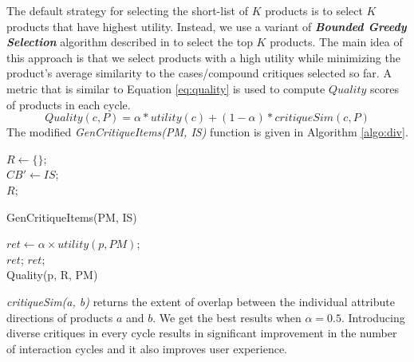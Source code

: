 The default strategy for selecting the short-list of $K$ products is to select $K$ products that have highest utility.
Instead, we use a variant of \textit{\textbf{Bounded Greedy Selection}} algorithm described in \cite{boundedGreedy} to select the top $K$ products.
The main idea of this approach is that we select products with a high utility while minimizing the product's average similarity to the cases/compound critiques selected so far.
A metric that is similar to Equation \ref{eq:quality} is used to compute $Quality$ scores of products in each cycle.
\begin{equation}
\label{eq:quality}
Quality(c, P) = \alpha * utility(c) + (1-\alpha)*critiqueSim(c, P)
\end{equation}
%
The modified \textit{GenCritiqueItems(PM, IS)} function is given in Algorithm \ref{algo:div}.
\begin{algorithm}[ht]
  \DontPrintSemicolon

  $R \gets \{\}$;\\
  $CB' \gets IS$;\\
  \Return $R;$
  \caption{GenCritiqueItems(PM, IS)}
  \label{algo:div}
\end{algorithm}

\begin{algorithm}[ht]
  \DontPrintSemicolon

  $ret \gets \alpha \times utility(p, PM)$; \\
   {\Return $ret$;}
  \Return $ret;$\\
  \caption{Quality(p, R, PM)}
  \label{algo:quality}
\end{algorithm}

\textit{critiqueSim(a, b)} returns the extent of overlap between the individual attribute directions of products $a$ and $b$.
We get the best results when $\alpha = 0.5$.
Introducing diverse critiques in every cycle results in significant improvement in the number of interaction cycles and it also improves user experience.




